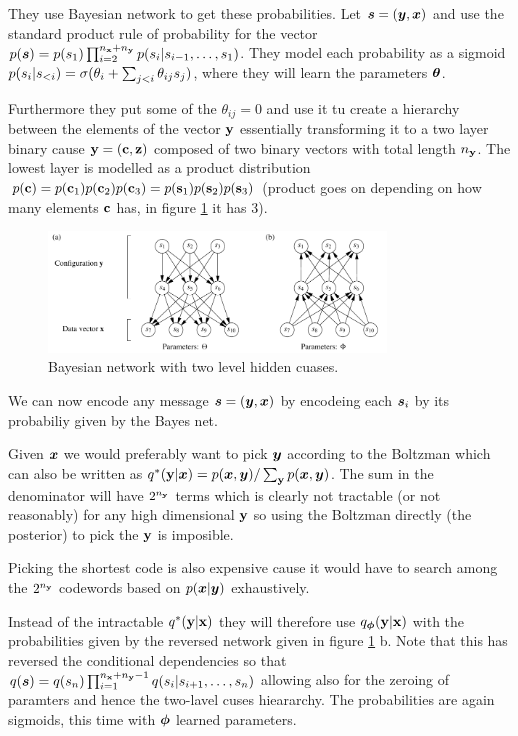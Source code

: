 They use Bayesian network to get these probabilities.
Let ${\bm{s}} = ({\bm{y}}, {\bm{x}})$ and use the standard product rule of probability for the vector $p({\bm{s}}) = p({s}_1) \prod_{i=2}^{n_{{\mathbf{x}}} + n_{{\mathbf{y}}}} p({s}_i | {s}_{i-1}, \ldots, {s}_1)$.
They model each probability as a sigmoid $p({s}_i | {s}_{<i}) = \sigma(\theta_i + \sum_{j < i} \theta_{ij}{s}_j)$, where they will learn the parameters ${\bm{\theta}}$.

Furthermore they put some of the $\theta_{ij} = 0$ and use it tu create a hierarchy between the elements of the vector ${\mathbf{y}}$ essentially transforming it to a two layer binary cause ${\mathbf{y}} = ({\mathbf{c}}, {\mathbf{z}})$ composed of two binary vectors with total length $n_{{\mathbf{y}}}$.
The lowest layer is modelled as a product distribution $p({\mathbf{c}}) = p({\mathbf{c}}_1)p({\mathbf{c}}_2)p({\mathbf{c}}_3) = p({\mathbf{s}}_1)p({\mathbf{s}}_2)p({\mathbf{s}}_3)$ (product goes on depending on how many elements ${\mathbf{c}}$ has, in figure \ref{fig:Frey1997_2} it has 3).


\begin{figure}[h]
\centering
\includegraphics[width=0.8\textwidth]{Pics/Frey1997_2.png}
\caption{Bayesian network with two level hidden cuases.}
\label{fig:Frey1997_2}
\end{figure}

We can now encode any message ${\bm{s}} = ({\bm{y}}, {\bm{x}})$ by encodeing each ${\bm{s}}_i$ by its probabiliy given by the Bayes net.

Given ${\bm{x}}$ we would preferably want to pick ${\bm{y}}$ according to the Boltzman which can also be written as $q^*({\mathbf{y}} | {\bm{x}}) = p({\bm{x}}, {\bm{y}}) / \sum_{\mathbf{y}} p({\bm{x}}, {\bm{y}})$.
The sum in the denominator will have $2^{n_{\mathbf{y}}}$ terms which is clearly not tractable (or not reasonably) for any high dimensional ${\mathbf{y}}$ so using the Boltzman directly (the posterior) to pick the ${\mathbf{y}}$ is imposible.

Picking the shortest code is also expensive cause it would have to search among the $2^{n_{\mathbf{y}}}$ codewords based on $p({\bm{x}} | {\bm{y}})$ exhaustively.

Instead of the intractable $q^*({\mathbf{y}} | {\mathbf{x}})$ they will therefore use $q_{{\bm{\phi}}}({\mathbf{y}} | {\mathbf{x}})$ with the probabilities given by the reversed network given in figure \ref{fig:Frey1997_2} b.
Note that this has reversed the conditional dependencies so that $q({\bm{s}}) = q({s}_n) \prod_{i=1}^{n_{{\mathbf{x}}} + n_{{\mathbf{y}}}-1} q({s}_i | {s}_{i+1}, \ldots, {s}_n)$ allowing also for the zeroing of paramters and hence the two-lavel cuses hieararchy.
The probabilities are again sigmoids, this time with ${\bm{\phi}}$ learned parameters.

